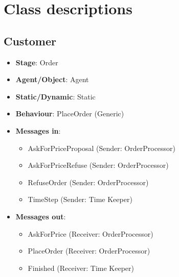 \documentclass[12pt]{article}
\begin{document}
\section{Class descriptions}%
\label{sec:agent_descriptions}

\subsection{Customer}%
\label{sub:customer_agent}
\begin{itemize}
    \item \textbf{Stage}: Order
    \item \textbf{Agent/Object}: Agent
    \item \textbf{Static/Dynamic}: Static
    \item \textbf{Behaviour}: PlaceOrder (Generic)
    \item \textbf{Messages in}:
        \begin{itemize}
            \item AskForPriceProposal (Sender: OrderProcessor)
            \item AskForPriceRefuse (Sender: OrderProcessor)
            \item RefuseOrder (Sender: OrderProcessor)
            \item TimeStep (Sender: Time Keeper)
        \end{itemize}
    \item \textbf{Messages out}:
        \begin{itemize}
            \item AskForPrice (Receiver: OrderProcessor)
            \item PlaceOrder (Receiver: OrderProcessor)
            \item Finished (Receiver: Time Keeper)
        \end{itemize}
\end{itemize}

\newpage{}
\end{document}
